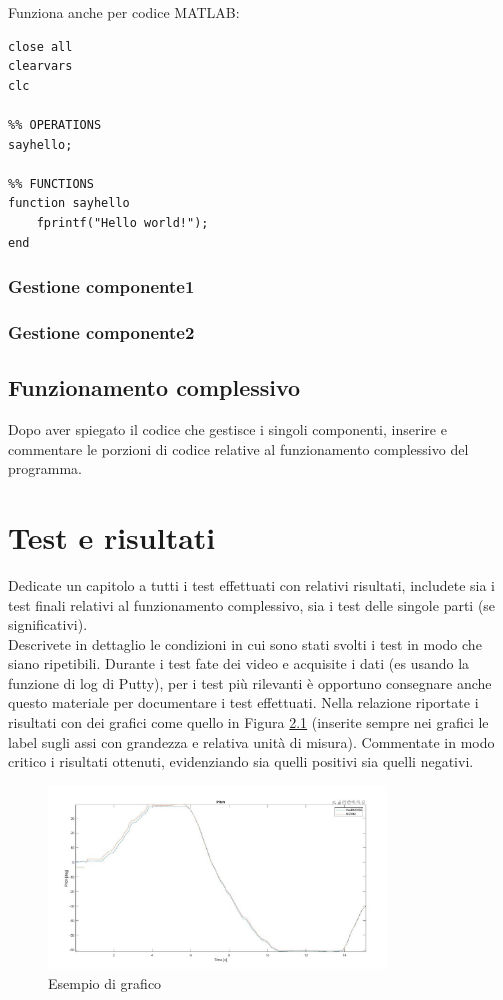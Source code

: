 \documentclass[11pt]{report}
\begin{document}


Funziona anche per codice MATLAB:
\begin{lstlisting}[language=MATLABc, caption="Codice in MATLAB"]
%% PREPARE WORKSPACE
close all
clearvars
clc

%% OPERATIONS
sayhello;

%% FUNCTIONS
function sayhello
    fprintf("Hello world!");
end

\end{lstlisting}


\subsection{Gestione componente1}

\subsection{Gestione componente2}

\section{Funzionamento complessivo}
Dopo aver spiegato il codice che gestisce i singoli componenti, inserire e commentare le porzioni di codice relative al funzionamento complessivo del programma.

\chapter{Test e risultati}
Dedicate un capitolo a tutti i test effettuati con relativi risultati, includete sia i test finali relativi al funzionamento complessivo, sia i test delle singole parti (se significativi). \\
Descrivete in dettaglio le condizioni in cui sono stati svolti i test in modo che siano ripetibili. Durante i test fate dei video e acquisite i dati (es usando la funzione di log di Putty), per i test più rilevanti è opportuno consegnare anche questo materiale per documentare i test effettuati. Nella relazione riportate i risultati con dei grafici come quello in Figura \ref{fig:grafico} (inserite sempre nei grafici le label sugli assi con grandezza e relativa unità di misura). Commentate in modo critico i risultati ottenuti, evidenziando sia quelli positivi sia quelli negativi. 

\begin{figure}[H]
\centering
\includegraphics[width=0.8\textwidth,keepaspectratio]{figures/grafico.JPG}
\caption{Esempio di grafico}
\label{fig:grafico}
\end{figure}
\end{document}

